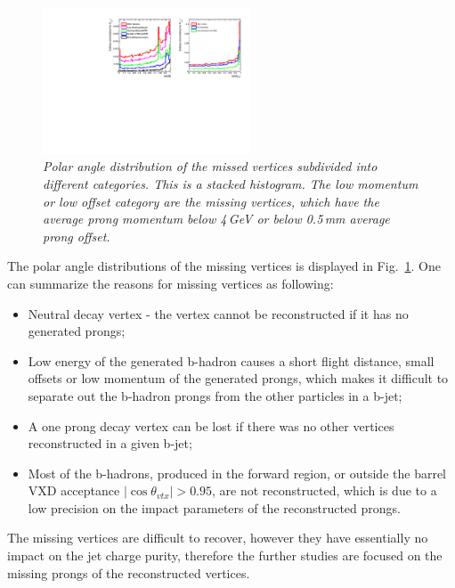 \begin{figure}[h]
{\centering
    \includegraphics[clip, trim=10.cm 0cm 0.cm 0cm, width=0.55\textwidth]{ILD/plots/missed-cos-vtx.pdf}
    \caption{\sl Polar angle distribution of the missed vertices subdivided into different categories. This is a stacked histogram. The low momentum or low offset category are the missing vertices, which have the average prong momentum below  4\,GeV or below 0.5\,mm average prong offset.
    }
    \label{fig:MissedCos_3}
  }
\end{figure}

The polar angle distributions of the missing vertices is displayed in Fig.~\ref{fig:MissedCos_3}. 
One can summarize the reasons for missing vertices as following: 
\begin{itemize}
\item Neutral decay vertex - the vertex cannot be reconstructed if it has no generated prongs;
\item Low energy of the generated b-hadron causes a short flight distance, small offsets or low momentum of the generated prongs, which makes it difficult to separate out the b-hadron prongs from the other particles in a b-jet;
\item A one prong decay vertex can be lost if there was no other vertices reconstructed in a given b-jet;
\item Most of the b-hadrons, produced in the forward region, or outside the barrel VXD acceptance $|\cos\theta_{vtx}| > 0.95$, are not reconstructed, which is due to a low precision on the impact parameters of the reconstructed prongs. 
\end{itemize}


The missing vertices are difficult to recover, however they have essentially no impact on the jet charge purity, therefore the further studies are focused on the missing prongs of the reconstructed vertices.
